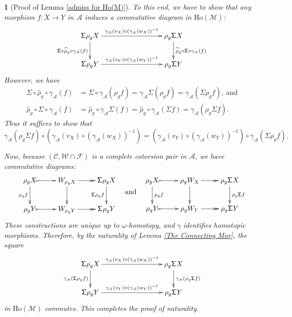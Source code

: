 \documentclass[12pt,twoside]{amsart}
\theoremstyle{bfupright head,slanted body}
\theoremstyle{bfupright head,upright body}
\newtheorem{bfhpg}[res]{}               \newtheorem*{bfhpg*}{}
\theoremstyle{fixed bf head,slanted body}
\theoremstyle{fixed bf head,upright body}
\theoremstyle{numbered paragraph}
\numberwithin{equation}{res}
\newcommand{\calC}{\mathcal{C}}
\newcommand{\calW}{\mathcal{W}}
\newcommand{\calF}{\mathcal{F}}
\newcommand{\calA}{\mathcal{A}}
\newcommand{\calM}{\mathcal{M}}
\newcommand{\Ho}{\mathrm{Ho}}
\begin{document}
\begin{bfhpg}[Proof of Lemma \ref{admiss for Ho(M)}]
To this end, we have to show that any morphism $f : X \to Y$ in $\calA$ induces a commutative diagram in $\Ho(\calM)$:
\[
\xymatrix@C=3CM{
   \mathsf{\Sigma} \rho_g X
\ar[d]_-{\mathsf{\Sigma} \circ \widehat{\rho}_g \circ \gamma_{\calA}(f)}
\ar[r]^-{\gamma_{\calA}(v_X) \circ (\gamma_{\calA}(w_X))^{-1}}
&  \rho_g \mathsf{\Sigma} X
\ar[d]^-{\widehat{\rho}_g \circ \mathsf{\Sigma} \circ \gamma_{\calA}(f)}           \\
   \mathsf{\Sigma} \rho_g Y
\ar[r]^-{\gamma_{\calA}(v_Y) \circ (\gamma_{\calA}(w_Y))^{-1}}
&  \rho_g \mathsf{\Sigma} Y                                                                  }
\]
However, we have
\begin{align*}
     \mathsf{\Sigma} \circ \widehat{\rho}_g \circ \gamma_{\calA} (f)
& =  \mathsf{\Sigma} \circ \gamma_{\calA} (\rho_g f)
  =  \gamma_{\calA} \mathsf{\Sigma} (\rho_g f)
  =  \gamma_{\calA} (\mathsf{\Sigma} \rho_g f), \ \text{and}    \\
     \widehat{\rho}_g \circ \mathsf{\Sigma} \circ \gamma_{\calA} (f)
& =  \widehat{\rho}_g \circ \gamma_{\calA} \mathsf{\Sigma} (f)
  =  \widehat{\rho}_g \circ \gamma_{\calA} (\mathsf{\Sigma} f)
  =  \gamma_{\calA} (\rho_g \mathsf{\Sigma} f).
\end{align*}
Thus it suffices to show that 
$$\gamma_{\calA} (\rho_g \mathsf{\Sigma} f) \circ (\gamma_{\calA}(v_X) \circ (\gamma_{\calA}(w_X))^{-1}) = (\gamma_{\calA}(v_Y) \circ (\gamma_{\calA}(w_Y))^{-1}) \circ \gamma_{\calA} (\mathsf{\Sigma} \rho_g f).$$

Now, because $(\calC, \calW \cap \calF)$ is a complete cotorsion pair in $\calA$, we have commutative diagrams:
\[
\xymatrix{
   \rho_g X
\ar[d]_-{\rho_g f}
\ar@{>->}[r]
&  W_{\rho_g X}
\ar[d]
\ar@{->>}[r]
&  \mathsf{\Sigma} \rho_g X
\ar[d]_-{\mathsf{\Sigma} \rho_g f}                      \\
   \rho_g Y
\ar@{>->}[r]
&  W_{\rho_g Y}
\ar@{->>}[r]
&  \mathsf{\Sigma} \rho_g Y                                                   }
\quad \raisebox{-3.8ex}{\text{and}} \quad
\xymatrix{
   \rho_g X
\ar[d]^-{\rho_g f}
\ar@{>->}[r]
&  \rho_g W_X
\ar[d]
\ar@{->>}[r]
&  \rho_g \mathsf{\Sigma} X
\ar[d]^-{\rho_g \mathsf{\Sigma} f}                      \\
   \rho_g Y
\ar@{>->}[r]
&  \rho_g W_Y
\ar@{->>}[r]
&  \rho_g \mathsf{\Sigma} Y                                                 }
\]
These constructions are unique up to $\omega$-homotopy, and $\gamma$ identifies homotopic morphisms.
Therefore, by the naturality of Lemma \ref{The Connecting Mor}, the square
\[
\xymatrix@C=3CM{
   \mathsf{\Sigma} \rho_g X
\ar[d]_-{\gamma_{\calA} (\mathsf{\Sigma} \rho_g f)}
\ar[r]^-{\gamma_{\calA}(v_X) \circ (\gamma_{\calA}(w_X))^{-1}}
&  \rho_g \mathsf{\Sigma} X
\ar[d]^-{\gamma_{\calA} (\rho_g \mathsf{\Sigma} f)}           \\
   \mathsf{\Sigma} \rho_g Y
\ar[r]^-{\gamma_{\calA}(v_Y) \circ (\gamma_{\calA}(w_Y))^{-1}}
&  \rho_g \mathsf{\Sigma} Y                                                                  }
\]
in $\Ho(\calM)$ commutes.
This completes the proof of naturality.


\end{bfhpg}
\end{document}
